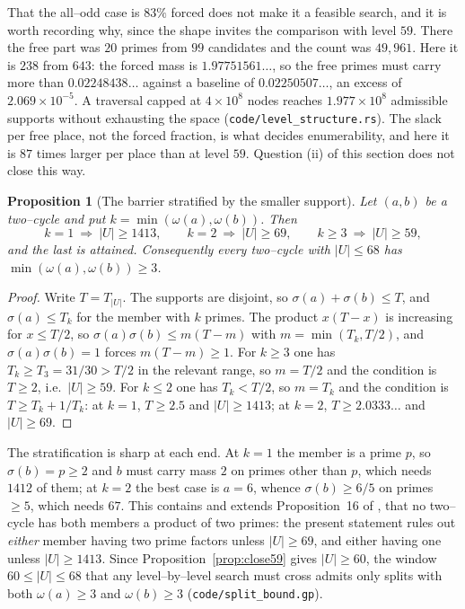 \documentclass[11pt]{article}
\newtheorem{proposition}[theorem]{Proposition}
\theoremstyle{definition}
\begin{document}
That the all--odd case is $83\%$ forced does not make it a feasible search, and it is worth
recording why, since the shape invites the comparison with level $59$. There the free part was $20$
primes from $99$ candidates and the count was $49{,}961$. Here it is $238$ from $643$: the forced
mass is $1.97751561\ldots$, so the free primes must carry more than $0.02248438\ldots$ against a
baseline of $0.02250507\ldots$, an excess of $2.069\times10^{-5}$. A traversal capped at
$4\times10^{8}$ nodes reaches $1.977\times10^{8}$ admissible supports without exhausting the space
\textup{(\texttt{code/level\_structure.rs})}. The slack per free place, not the forced fraction, is
what decides enumerability, and here it is $87$ times larger per place than at level $59$. Question
(ii) of this section does not close this way.

\begin{proposition}[The barrier stratified by the smaller support]\label{prop:split}
Let $(a,b)$ be a two--cycle and put $k=\min(\omega(a),\omega(b))$. Then
\[ k=1\ \Rightarrow\ |U|\ge1413, \qquad k=2\ \Rightarrow\ |U|\ge69, \qquad
   k\ge3\ \Rightarrow\ |U|\ge59, \]
and the last is attained. Consequently every two--cycle with $|U|\le68$ has
$\min(\omega(a),\omega(b))\ge3$.
\end{proposition}
\begin{proof}
Write $T=T_{|U|}$. The supports are disjoint, so $\sigma(a)+\sigma(b)\le T$, and
$\sigma(a)\le T_k$ for the member with $k$ primes. The product $x(T-x)$ is increasing for
$x\le T/2$, so $\sigma(a)\sigma(b)\le m(T-m)$ with $m=\min(T_k,T/2)$, and $\sigma(a)\sigma(b)=1$
forces $m(T-m)\ge1$. For $k\ge3$ one has $T_k\ge T_3=31/30>T/2$ in the relevant range, so $m=T/2$
and the condition is $T\ge2$, i.e.\ $|U|\ge59$. For $k\le2$ one has $T_k<T/2$, so $m=T_k$ and the
condition is $T\ge T_k+1/T_k$: at $k=1$, $T\ge2.5$ and $|U|\ge1413$; at $k=2$, $T\ge2.0333\ldots$ and
$|U|\ge69$.
\end{proof}

The stratification is sharp at each end. At $k=1$ the member is a prime $p$, so $\sigma(b)=p\ge2$ and
$b$ must carry mass $2$ on primes other than $p$, which needs $1412$ of them; at $k=2$ the best case
is $a=6$, whence $\sigma(b)\ge6/5$ on primes $\ge5$, which needs $67$. This contains and extends
Proposition~16 of \cite{Kovic2012}, that no two--cycle has both members a product of two primes: the
present statement rules out \emph{either} member having two prime factors unless $|U|\ge69$, and
either having one unless $|U|\ge1413$. Since Proposition~\ref{prop:close59} gives $|U|\ge60$, the
window $60\le|U|\le68$ that any level--by--level search must cross admits only splits with both
$\omega(a)\ge3$ and $\omega(b)\ge3$ \textup{(\texttt{code/split\_bound.gp})}.
\end{document}
